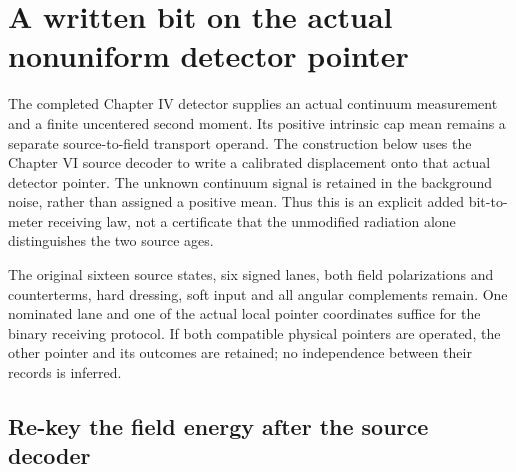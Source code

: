 \section{A written bit on the actual nonuniform detector pointer}
\label{sec:chvidr-detector-join}

The completed Chapter IV detector supplies an actual continuum measurement
and a finite uncentered second moment. Its positive intrinsic cap mean
remains a separate source-to-field transport operand. The construction
below uses the Chapter VI source decoder to write a calibrated displacement
onto that actual detector pointer. The unknown continuum signal is retained
in the background noise, rather than assigned a positive mean. Thus this
is an explicit added bit-to-meter receiving law, not a certificate that the
unmodified radiation alone distinguishes the two source ages.

The original sixteen source states, six signed lanes, both field
polarizations and counterterms, hard dressing, soft input and all angular
complements remain. One nominated lane and one of the actual local pointer
coordinates suffice for the binary receiving protocol. If both compatible
physical pointers are operated, the other pointer and its outcomes are
retained; no independence between their records is inferred.

\subsection{Re-key the field energy after the source decoder}
\label{sec:chvidr-postdecoder-energy}

